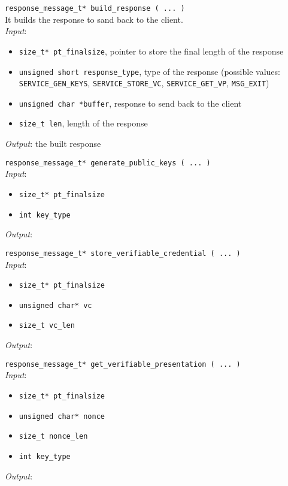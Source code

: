 \noindent
\texttt{response\_message\_t* build\_response ( ... )}\\
It builds the response to sand back to the client. \\
\textit{Input}:
\begin{itemize}[noitemsep,nolistsep]
\item \texttt{size\_t* pt\_finalsize}, pointer to store the final length of the response
\item \texttt{unsigned short response\_type}, type of the response (possible values: \texttt{SERVICE\_\-GEN\_KEYS}, \texttt{SERVICE\_STORE\_VC}, \texttt{SERVICE\_GET\_VP}, \texttt{MSG\_EXIT})
\item \texttt{unsigned char *buffer}, response to send back to the client
\item \texttt{size\_t len}, length of the response
\end{itemize}
\textit{Output}: the built response 


\noindent
\texttt{response\_message\_t* generate\_public\_keys ( ... )}\\
\textit{Input}:
\begin{itemize}[noitemsep,nolistsep]
\item \texttt{size\_t* pt\_finalsize}
\item \texttt{int key\_type}
\end{itemize}
\textit{Output}: 

\noindent
\texttt{response\_message\_t* store\_verifiable\_credential ( ... )}\\
\textit{Input}:
\begin{itemize}[noitemsep,nolistsep]
  \item \texttt{size\_t* pt\_finalsize}
  \item \texttt{unsigned char* vc}
  \item \texttt{size\_t vc\_len}
\end{itemize}
\textit{Output}: 

\noindent
\texttt{response\_message\_t* get\_verifiable\_presentation ( ... )}\\
\textit{Input}:
\begin{itemize}[noitemsep,nolistsep]
  \item \texttt{size\_t* pt\_finalsize}
  \item \texttt{unsigned char* nonce}
  \item \texttt{size\_t nonce\_len}
  \item \texttt{int key\_type}
\end{itemize}
\textit{Output}: 

